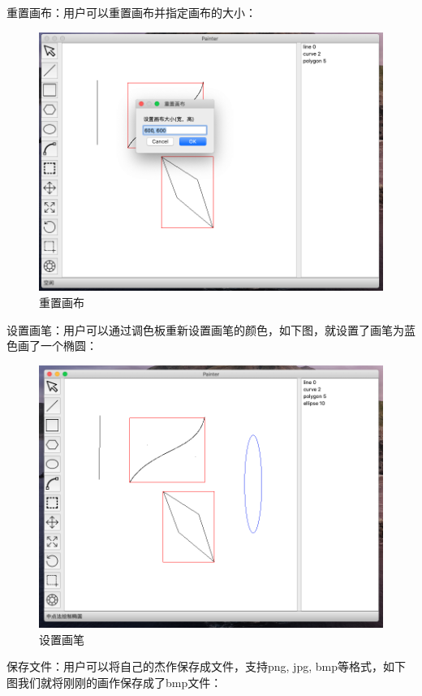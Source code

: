 \documentclass[a4paper,UTF8]{article}
\theoremstyle{definition}
\begin{document}
重置画布：用户可以重置画布并指定画布的大小：

\begin{figure}[H]
    \centering
    \includegraphics[scale=0.5]{reset.png}
    \caption{重置画布}
\end{figure}

设置画笔：用户可以通过调色板重新设置画笔的颜色，如下图，就设置了画笔为蓝色画了一个椭圆：

\begin{figure}[H]
    \centering
    \includegraphics[scale=0.5]{color.png}
    \caption{设置画笔}
\end{figure}

保存文件：用户可以将自己的杰作保存成文件，支持png, jpg, bmp等格式，如下图我们就将刚刚的画作保存成了bmp文件：
\end{document}

